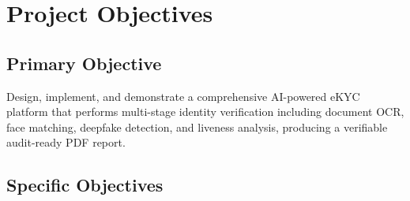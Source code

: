 \documentclass[12pt,a4paper]{report}
\begin{document}
\section{Project Objectives}

\subsection{Primary Objective}
Design, implement, and demonstrate a comprehensive AI-powered eKYC platform that performs multi-stage identity verification including document OCR, face matching, deepfake detection, and liveness analysis, producing a verifiable audit-ready PDF report.

\subsection{Specific Objectives}
\end{document}
